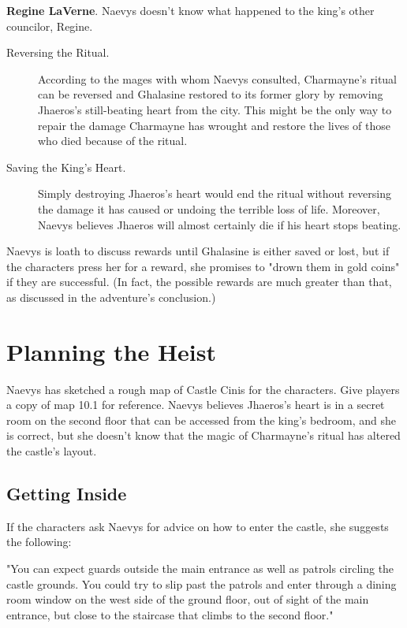 \documentclass[10pt,a4paper,twoside,bg=print,twocolumn,openany,nodeprecatedcode]{dndbook}
\begin{document}
\textbf{Regine LaVerne}. Naevys doesn't know what happened to the king's other councilor, Regine.


\begin{description}
\item[Reversing the Ritual.]
According to the mages with whom Naevys consulted, Charmayne's ritual can be reversed and Ghalasine restored to its former glory by removing Jhaeros's still-beating heart from the city. This might be the only way to repair the damage Charmayne has wrought and restore the lives of those who died because of the ritual.
\item[Saving the King's Heart.]
Simply destroying Jhaeros's heart would end the ritual without reversing the damage it has caused or undoing the terrible loss of life. Moreover, Naevys believes Jhaeros will almost certainly die if his heart stops beating.
\end{description}

Naevys is loath to discuss rewards until Ghalasine is either saved or lost, but if the characters press her for a reward, she promises to "drown them in gold coins" if they are successful. (In fact, the possible rewards are much greater than that, as discussed in the adventure's conclusion.)

\section{Planning the Heist}
Naevys has sketched a rough map of Castle Cinis for the characters. Give players a copy of map 10.1 for reference. Naevys believes Jhaeros's heart is in a secret room on the second floor that can be accessed from the king's bedroom, and she is correct, but she doesn't know that the magic of Charmayne's ritual has altered the castle's layout.

\subsection{Getting Inside}
If the characters ask Naevys for advice on how to enter the castle, she suggests the following:

\begin{DndReadAloud}{}
"You can expect guards outside the main entrance as well as patrols circling the castle grounds. You could try to slip past the patrols and enter through a dining room window on the west side of the ground floor, out of sight of the main entrance, but close to the staircase that climbs to the second floor."

\end{DndReadAloud}
\end{document}
